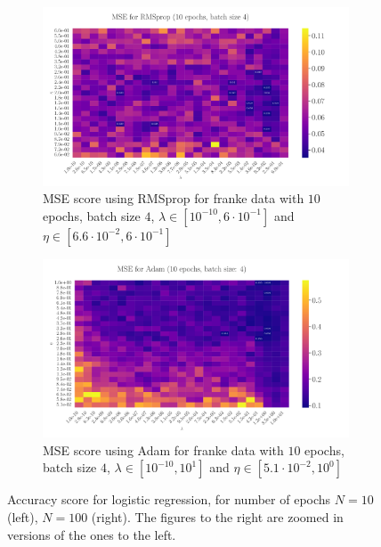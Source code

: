 \documentclass[%
reprint,s
amsmath,amssymb,
aps,
]{revtex4-2}
\begin{document}
\begin{figure}
\begin{subfigure}{0.4353\textwidth}
		\includegraphics[width=\textwidth]{Python/Figures/LinRegRMSprop_25x25_epoch10_batchS4.pdf}
		\caption{MSE score using RMSprop for franke data with \(10\) epochs, batch size \(4\), \(\lambda\in[10^{-10}, 6\cdot 10^{-1}]\) and \(\eta\in[6.6\cdot 10^{-2}, 6\cdot 10^{-1}]\)}
		\label{fig:LogReg25x25_epoch100_bacthS50}
	\end{subfigure}
	\hfill
	\begin{subfigure}{0.4353\textwidth}
		\includegraphics[width=\textwidth]{Python/Figures/LinRegAdam_25x25_epoch10_batchS4_zoomed.pdf}
		\caption{MSE score using Adam for franke data with \(10\) epochs, batch size \(4\), \(\lambda\in[10^{-10}, 10^{1}]\) and \(\eta\in[5.1\cdot 10^{-2}, 10^{0}]\)}
		\label{fig:LogReg25x25_epoch100_bacthS50_zoomed}
	\end{subfigure}
	\caption{Accuracy score for logistic regression, for number of epochs \(N=10\) (left), \(N=100\) (right). The figures to the right are zoomed in versions of the ones to the left.}
	\label{fig:LogReg}
\end{figure}
\end{document}
